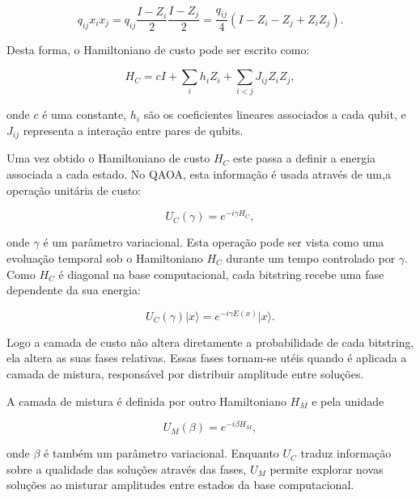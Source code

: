 \documentclass[12pt,a4paper]{article}
\begin{document}
\begin{equation}
    q_{ij}x_ix_j
    =
    q_{ij}\frac{I - Z_i}{2}\frac{I - Z_j}{2}
    =
    \frac{q_{ij}}{4}
    \left(I - Z_i - Z_j + Z_iZ_j\right).
\end{equation}

Desta forma, o Hamiltoniano de custo pode ser escrito como:

\begin{equation}
    H_C =
    cI
    +
    \sum_i h_i Z_i
    +
    \sum_{i<j} J_{ij} Z_iZ_j,
\end{equation}

onde $c$ é uma constante, $h_i$ são os coeficientes lineares associados a cada
qubit, e $J_{ij}$ representa a interação entre pares de qubits.

Uma vez obtido o Hamiltoniano de custo $H_C$ este passa a definir a energia associada a cada estado. No QAOA, esta informação é usada através de um,a operação unitária de custo:

\begin{equation}
    U_C(\gamma) = e^{-i\gamma H_C},
\end{equation}

onde $\gamma$ é um parâmetro variacional. Esta operação pode ser vista como uma evoluação temporal sob o Hamiltoniano $H_C$ durante um tempo controlado por $\gamma$. Como $H_C$ é diagonal na base computacional, cada bitstring recebe uma fase dependente da sua energia:

\begin{equation}
    U_C(\gamma)\lvert x\rangle
    =
    e^{-i\gamma E(x)}\lvert x\rangle.
\end{equation}

Logo a camada de custo não altera diretamente a probabilidade de cada bitstring, ela altera as suas fases relativas. Essas fases tornam-se utéis quando é aplicada a camada de mistura, responsável por distribuir amplitude entre soluções.

A camada de mistura é definida por outro Hamiltoniano $H_M$ e pela unidade

\begin{equation}
\label{eq_mixer_op}
    U_M(\beta) = e^{-i\beta H_M},
\end{equation}

onde $\beta$ é também um parâmetro variacional. Enquanto $U_C$ traduz informação
sobre a qualidade das soluções através das fases, $U_M$ permite explorar novas
soluções ao misturar amplitudes entre estados da base computacional.
\end{document}
